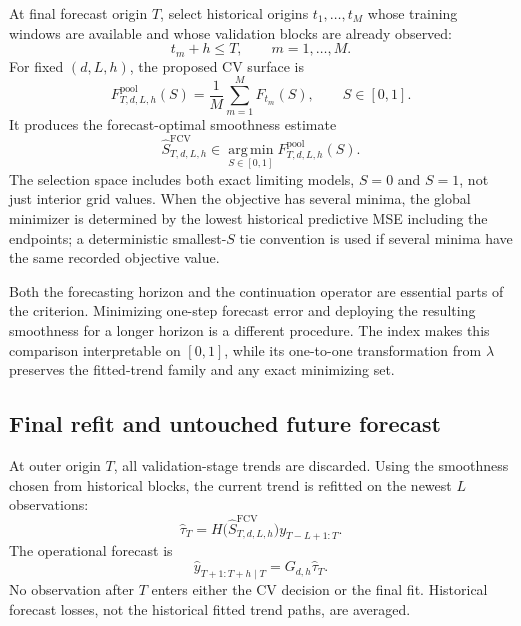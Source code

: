 At final forecast origin $T$, select historical origins
$t_1,\ldots,t_M$ whose training windows are available and
whose validation blocks are already observed:
\begin{equation}
\label{eq:chronological_origin_restriction}
t_m+h\le T,\qquad m=1,\ldots,M.
\end{equation}
For fixed $(d,L,h)$, the proposed CV surface is
\begin{equation}
\label{eq:F_S}
F^{\mathrm{pool}}_{T,d,L,h}(S)
=\frac1M\sum_{m=1}^M F_{t_m}(S),
\qquad S\in[0,1].
\end{equation}
It produces the forecast-optimal smoothness estimate
\begin{equation}
\label{eq:Sstar}
\widehat S^{\mathrm{FCV}}_{T,d,L,h}
\in\operatorname*{arg\,min}_{S\in[0,1]}
F^{\mathrm{pool}}_{T,d,L,h}(S).
\end{equation}
The selection space includes both exact limiting models,
$S=0$ and $S=1$, not just interior grid values.
When the objective has several minima, the global
minimizer is determined by the lowest historical predictive
MSE including the endpoints; a deterministic smallest-$S$
tie convention is used if several minima have the same
recorded objective value.

Both the forecasting horizon and the continuation operator
are essential parts of the criterion. Minimizing one-step
forecast error and deploying the resulting smoothness for
a longer horizon is a different procedure. The index makes
this comparison interpretable on $[0,1]$, while its
one-to-one transformation from $\lambda$ preserves the
fitted-trend family and any exact minimizing set.

\subsection{Final refit and untouched future forecast}

At outer origin $T$, all validation-stage trends are
discarded. Using the smoothness chosen from historical
blocks, the current trend is refitted on the newest
$L$ observations:
\begin{equation}
\label{eq:final_refit}
\widehat\tau_T
=H\bigl(\widehat S^{\mathrm{FCV}}_{T,d,L,h}\bigr)
y_{T-L+1:T}.
\end{equation}
The operational forecast is
\begin{equation}
\label{eq:final_operational_forecast}
\widehat y_{T+1:T+h\mid T}
=G_{d,h}\widehat\tau_T.
\end{equation}
No observation after $T$ enters either the CV decision
or the final fit. Historical forecast losses, not the
historical fitted trend paths, are averaged.

